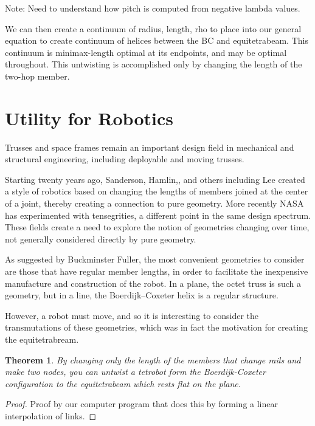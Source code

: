 \documentclass[11pt]{article}
\newtheorem{theorem}{Theorem}
\begin{document}
Note: Need to understand how pitch is computed from negative lambda values.

We can then create a continuum of radius, length, rho to place into our general equation
to create continuum of helices between the BC and equitetrabeam. This continuum is 
minimax-length optimal at its endpoints, and may be optimal throughout. This untwisting is accomplished
only by changing the length of the two-hop member.

\section{Utility for Robotics}

Trusses and space frames remain an important design field in mechanical and structural engineering\cite{mikulas1985sequentially},
including deployable and moving trusses\cite{claypool2012readily}.

Starting twenty years ago, Sanderson\cite{sanderson1996modular}, Hamlin,\cite{TetrobotBook}, and others including Lee\cite{lee2002dynamic}
created a style of robotics based on changing the lengths of members
joined at the center of a joint, thereby creating a connection to pure geometry. More recently NASA has experimented with
tensegrities\cite{NTRT}, a different point in the same design spectrum. These fields create a need to explore the notion of
geometries changing over time, not generally considered directly by pure geometry.

As suggested by Buckminster Fuller, the most convenient geometries to consider are those that have regular member
lengths, in order to facilitate the inexpensive manufacture and construction of the robot.  In a plane, the octet truss
is such a geometry, but in a line, the Boerdijk--Coxeter helix is a regular structure.

However, a robot must move, and so it is interesting to consider the transmutations of these geometries, which was in
fact the motivation for creating the equitetrabream.

\begin{theorem}
  By changing only the length of the members that change rails and make two nodes, you can untwist a tetrobot
  form the Boerdijk-Coxeter configuration to the equitetrabeam which rests flat on the plane.
\end{theorem}

\begin{proof}
  Proof by our computer program that does this by forming a linear interpolation of links.
\end{proof}
\end{document}
